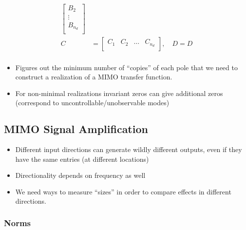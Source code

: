 \begin{enumerate}
\begin{align*}
\begin{bmatrix}
                     B_2     \\
                     \vdots  \\
                     B_{n_d} \\
                 \end{bmatrix}                                                                                                                             \\
              C & =\begin{bmatrix}
                       C_1 & C_2 & \dots & C_{n_d} \\
                   \end{bmatrix}, \quad
              D = D                                                                                                                                         \\
          \end{align*}
\end{enumerate}


\begin{itemize}
    \item Figures out the minimum number of ``copies'' of each pole that we need to construct a realization of a MIMO transfer function.
    \item For non-minimal realizations invariant zeros can give additional zeros (correspond to uncontrollable/unobservable modes)
\end{itemize}

\subsection{MIMO Signal Amplification}


\begin{itemize}
    \item Different input directions can generate wildly different outputs, even if they have the same entries (at different locations)
    \item Directionality depends on frequency as well
    \item We need ways to measure ``sizes'' in order to compare effects in different directions.
\end{itemize}

\subsubsection{Norms}

